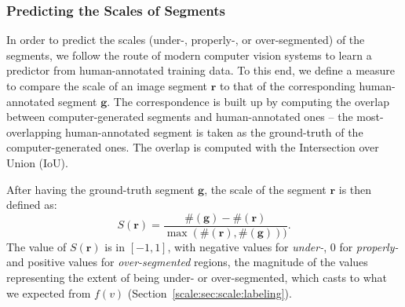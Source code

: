 % 
% 

\subsubsection{Predicting the Scales of Segments}
\label{scale:sec:scale}
In order to predict the scales (under-, properly-, or
over-segmented) of the segments, we follow the route of modern computer vision
systems to learn a predictor from human-annotated training data.
To this end, we define a measure to compare the scale of an image segment
$\mathbf{r}$ to that of the corresponding human-annotated segment
$\mathbf{g}$.
The correspondence is built up by computing the overlap between computer-generated segments and
human-annotated ones -- the most-overlapping human-annotated segment is taken as the
ground-truth of the computer-generated ones.
The overlap is computed with the Intersection over Union (IoU).

After having the ground-truth segment $\mathbf{g}$, the scale of the
segment $\mathbf{r}$ is then defined as:
\begin{equation}
\label{scale:eq:scale}
S(\mathbf{r}) = \frac{\#(\mathbf{g}) - \#(\mathbf{r})}{\max( \#(\mathbf{r}), \#(\mathbf{g})))}.
\end{equation}
The value of $S(\mathbf{r})$ is in $[-1, 1]$, with negative values for
\emph{under-}, $0$ for \emph{properly-} and positive values for
\emph{over-segmented} regions, the magnitude of the values representing the extent of being under- or over-segmented, which casts to what we expected from
$f(v)$ (\cf Section~\ref{scale:sec:scale:labeling}). 

